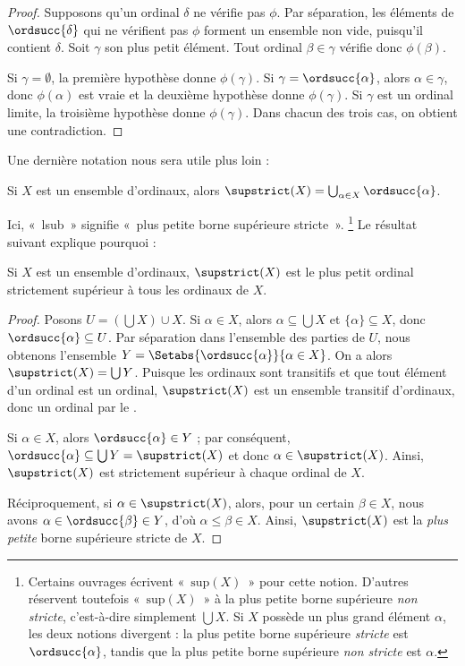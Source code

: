 \documentclass[../../../include/open-logic-section]{subfiles}
\begin{document}
\begin{proof}
Supposons qu'un ordinal $\delta$ ne vérifie pas $\phi$. Par séparation,
les éléments de $\ordsucc{\delta}$ qui ne vérifient pas $\phi$ forment
un ensemble non vide, puisqu'il contient $\delta$. Soit $\gamma$ son
plus petit élément. Tout ordinal $\beta \in \gamma$ vérifie donc
$\phi(\beta)$.

Si $\gamma = \emptyset$, la première hypothèse donne $\phi(\gamma)$.
Si $\gamma = \ordsucc{\alpha}$, alors $\alpha \in \gamma$, donc
$\phi(\alpha)$ est vraie et la deuxième hypothèse donne $\phi(\gamma)$.
Si $\gamma$ est un ordinal limite, la troisième hypothèse donne
$\phi(\gamma)$. Dans chacun des trois cas, on obtient une contradiction.
\end{proof}
\noindent
Une dernière notation nous sera utile plus loin :

\begin{defn}
Si $X$ est un ensemble d'ordinaux, alors
$\supstrict(X) = \bigcup_{\alpha \in X} \ordsucc{\alpha}$.
\end{defn}
\noindent
Ici, «~lsub~» signifie «~plus petite borne supérieure stricte~».
\footnote{Certains ouvrages écrivent «~$\text{sup}(X)$~» pour cette
notion. D'autres réservent toutefois «~$\text{sup}(X)$~» à la plus
petite borne supérieure \emph{non stricte}, c'est-à-dire simplement
$\bigcup X$. Si $X$ possède un plus grand élément $\alpha$, les
deux notions divergent : la plus petite borne supérieure
\emph{stricte} est $\ordsucc{\alpha}$, tandis que la plus petite
borne supérieure \emph{non stricte} est $\alpha$.} Le résultat
suivant explique pourquoi :

\begin{prop}
Si $X$ est un ensemble d'ordinaux, $\supstrict(X)$ est le plus petit
ordinal strictement supérieur à tous les ordinaux de $X$.
\end{prop}

\begin{proof}
Posons $U = (\bigcup X) \cup X$. Si $\alpha \in X$, alors
$\alpha \subseteq \bigcup X$ et $\{\alpha\} \subseteq X$, donc
$\ordsucc{\alpha} \subseteq U$. Par séparation dans l'ensemble
des parties de $U$, nous obtenons l'ensemble
$Y = \Setabs{\ordsucc{\alpha}}{\alpha \in X}$. On a alors
$\supstrict(X) = \bigcup Y$. Puisque les ordinaux sont transitifs et
que tout élément d'un ordinal est un ordinal, $\supstrict(X)$ est un
ensemble transitif d'ordinaux, donc un ordinal par
le .

Si $\alpha \in X$, alors $\ordsucc{\alpha} \in Y$ ; par conséquent,
$\ordsucc{\alpha} \subseteq \bigcup Y = \supstrict(X)$ et donc
$\alpha \in \supstrict(X)$. Ainsi, $\supstrict(X)$ est strictement
supérieur à chaque ordinal de $X$.

Réciproquement, si $\alpha \in \supstrict(X)$, alors, pour un certain
$\beta \in X$, nous avons $\alpha \in \ordsucc{\beta} \in Y$, d'où
$\alpha \leq \beta \in X$. Ainsi, $\supstrict(X)$ est la
\emph{plus petite} borne supérieure stricte de $X$.
\end{proof}
\end{document}
